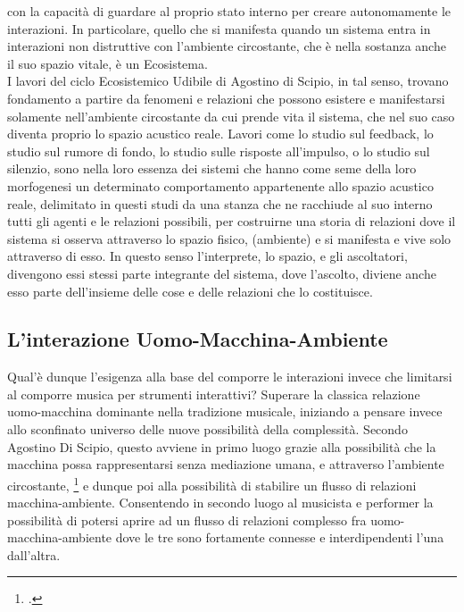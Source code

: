 con la capacità di guardare al proprio stato interno per creare autonomamente le interazioni.
In particolare, quello che si manifesta quando un sistema entra in interazioni non distruttive
con l'ambiente circostante, che è nella sostanza anche il suo spazio vitale, è un Ecosistema. \\
I lavori del ciclo Ecosistemico Udibile di Agostino di Scipio, in tal senso, 
trovano fondamento a partire da fenomeni e relazioni che possono esistere e manifestarsi solamente nell'ambiente 
circostante da cui prende vita il sistema, 
che nel suo caso diventa proprio lo spazio acustico reale. 
Lavori come lo studio sul feedback, lo studio sul rumore di fondo, lo studio sulle risposte all'impulso, o
lo studio sul silenzio, sono nella loro essenza dei sistemi che hanno come seme 
della loro morfogenesi un determinato 
comportamento appartenente allo spazio acustico reale, delimitato in questi studi da una stanza
che ne racchiude al suo interno tutti gli agenti e le relazioni possibili,
per costruirne una storia di relazioni dove il sistema si osserva attraverso lo spazio fisico, 
(ambiente) e si manifesta e vive solo attraverso di esso.
In questo senso l’interprete, lo spazio, e gli ascoltatori, 
divengono essi stessi parte integrante del sistema, dove l’ascolto, diviene anche esso
parte dell’insieme delle cose e delle relazioni che lo costituisce. \\

\subsection{L'interazione Uomo-Macchina-Ambiente}
\label{sec:L'interazione Uomo-Macchina-Ambiente}

Qual'è dunque l'esigenza alla base del comporre le interazioni invece 
che limitarsi al comporre musica per strumenti interattivi? 
Superare la classica relazione uomo-macchina dominante nella tradizione musicale, 
iniziando a pensare invece allo sconfinato universo delle nuove possibilità della complessità.
Secondo Agostino Di Scipio, questo avviene in primo luogo grazie 
alla possibilità che la macchina possa rappresentarsi
senza mediazione umana, e attraverso l'ambiente circostante, \footcite{discipio_polverisonore_2016}
e dunque poi alla possibilità di stabilire un flusso di relazioni macchina-ambiente. 
Consentendo in secondo luogo al musicista e performer 
la possibilità di potersi aprire ad un flusso di relazioni 
complesso fra uomo-macchina-ambiente dove le tre sono fortamente connesse e interdipendenti 
l'una dall'altra.

